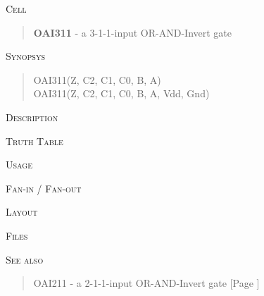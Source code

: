 
\label{OAI311}
\textsc{Cell}
\begin{quote}
    \textbf{OAI311} - a 3-1-1-input OR-AND-Invert gate
\end{quote}

\textsc{Synopsys}
\begin{quote}
    OAI311(Z, C2, C1, C0, B, A) \\
    OAI311(Z, C2, C1, C0, B, A, Vdd, Gnd)
\end{quote}

\textsc{Description}

%

\textsc{Truth Table}


\textsc{Usage}

\textsc{Fan-in / Fan-out}

\textsc{Layout}

\textsc{Files}

\textsc{See also}
\begin{quote}
    OAI211 - a 2-1-1-input OR-AND-Invert gate [Page \pageref{OAI211}] \\
\end{quote}
